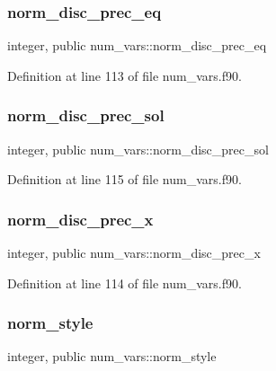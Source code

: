 \subsubsection{\texorpdfstring{norm\+\_\+disc\+\_\+prec\+\_\+eq}{norm\_disc\_prec\_eq}}
{\footnotesize\ttfamily integer, public num\+\_\+vars\+::norm\+\_\+disc\+\_\+prec\+\_\+eq}



Definition at line 113 of file num\+\_\+vars.\+f90.

\mbox{\label{namespacenum__vars_a125bbc64ad3fac6752bc64e4222c6f50}} 
\subsubsection{\texorpdfstring{norm\+\_\+disc\+\_\+prec\+\_\+sol}{norm\_disc\_prec\_sol}}
{\footnotesize\ttfamily integer, public num\+\_\+vars\+::norm\+\_\+disc\+\_\+prec\+\_\+sol}



Definition at line 115 of file num\+\_\+vars.\+f90.

\mbox{\label{namespacenum__vars_acba4a05e477f116855028f2057ce4e49}} 
\subsubsection{\texorpdfstring{norm\+\_\+disc\+\_\+prec\+\_\+x}{norm\_disc\_prec\_x}}
{\footnotesize\ttfamily integer, public num\+\_\+vars\+::norm\+\_\+disc\+\_\+prec\+\_\+x}



Definition at line 114 of file num\+\_\+vars.\+f90.

\mbox{\label{namespacenum__vars_acefc971404bce11e23308d5214d96d32}} 
\subsubsection{\texorpdfstring{norm\+\_\+style}{norm\_style}}
{\footnotesize\ttfamily integer, public num\+\_\+vars\+::norm\+\_\+style}



